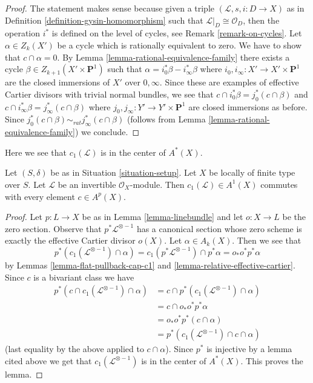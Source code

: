\begin{proof}
The statement makes sense because given a triple
$(\mathcal{L}, s, i : D \to X)$ as in
Definition \ref{definition-gysin-homomorphism}
such that $\mathcal{L}|_D \cong \mathcal{O}_D$, then
the operation $i^*$ is defined on the level of cycles, see
Remark \ref{remark-on-cycles}.
Let $\alpha \in Z_k(X')$ be a cycle which is rationally equivalent to zero.
We have to show that $c \cap \alpha = 0$. By
Lemma \ref{lemma-rational-equivalence-family}
there exists a cycle $\beta \in Z_{k + 1}(X' \times \mathbf{P}^1)$
such that $\alpha = i_0^*\beta - i_\infty^*\beta$
where $i_0, i_\infty : X' \to X' \times \mathbf{P}^1$ are the
closed immersions of $X'$ over $0, \infty$. Since these are
examples of effective Cartier divisors with trivial normal
bundles, we see that $c \cap i_0^*\beta = j_0^*(c \cap \beta)$
and $c \cap i_\infty^*\beta = j_\infty^*(c \cap \beta)$
where $j_0, j_\infty : Y' \to Y' \times \mathbf{P}^1$ are
closed immersions as before. Since
$j_0^*(c \cap \beta) \sim_{rat} j_\infty^*(c \cap \beta)$
(follows from Lemma \ref{lemma-rational-equivalence-family}) we conclude.
\end{proof}

\noindent
Here we see that $c_1(\mathcal{L})$ is in the center of $A^*(X)$.

\begin{lemma}
\label{lemma-c1-center}
Let $(S, \delta)$ be as in Situation \ref{situation-setup}.
Let $X$ be locally of finite type over $S$.
Let $\mathcal{L}$ be an invertible $\mathcal{O}_X$-module.
Then $c_1(\mathcal{L}) \in A^1(X)$ commutes with every
element $c \in A^p(X)$.
\end{lemma}

\begin{proof}
Let $p : L \to X$ be as in Lemma \ref{lemma-linebundle} and let $o : X \to L$
be the zero section. Observe that $p^*\mathcal{L}^{\otimes -1}$ has a
canonical section whose zero scheme is exactly the effective Cartier divisor
$o(X)$. Let $\alpha \in A_k(X)$. Then we see that
$$
p^*(c_1(\mathcal{L}^{\otimes -1}) \cap \alpha) =
c_1(p^*\mathcal{L}^{\otimes -1}) \cap p^*\alpha =
o_* o^* p^*\alpha
$$
by Lemmas \ref{lemma-flat-pullback-cap-c1} and
\ref{lemma-relative-effective-cartier}.
Since $c$ is a bivariant class we have
\begin{align*}
p^*(c \cap c_1(\mathcal{L}^{\otimes -1}) \cap \alpha)
& =
c \cap p^*(c_1(\mathcal{L}^{\otimes -1}) \cap \alpha) \\
& =
c \cap o_* o^* p^*\alpha \\
& =
o_* o^* p^*(c \cap \alpha) \\
& =
p^*(c_1(\mathcal{L}^{\otimes -1}) \cap c \cap \alpha)
\end{align*}
(last equality by the above applied to $c \cap \alpha$).
Since $p^*$ is injective by a lemma cited above we get that
$c_1(\mathcal{L}^{\otimes -1})$
is in the center of $A^*(X)$. This proves the lemma.
\end{proof}

